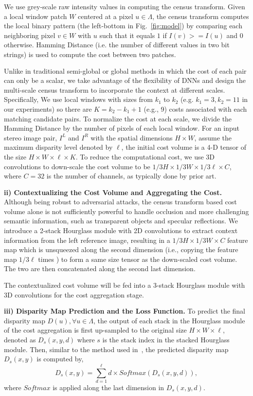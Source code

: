 \documentclass[10pt,twocolumn,letterpaper]{article}
\begin{document}
We use grey-scale raw intensity values in computing the census transform. Given a local window patch $W$ centered at a pixel $u\in\Lambda$, the census transform computes the local binary pattern (the left-bottom in Fig.~\ref{fig:model}) by comparing each neighboring pixel $v\in{W}$ with $u$ such that it equals $1$ if $I(v)>=I(u)$ and $0$ otherwise. Hamming Distance (i.e. the number of different values in two bit strings) is used to compute the cost between two patches.

Unlike in traditional semi-global or global methods in which the cost of each pair can only be a scalar, we take advantage of the flexibility of DNNs and design the multi-scale census transform to incorporate the context at different scales. Specifically, We use local windows with sizes from $k_1$ to $k_2$ (e.g. $k_1=3, k_2=11$ in our experiments) so there are $K=k_2-k_1+1$ (e.g., 9) costs associated with each matching candidate pairs. To normalize the cost at each scale, we divide the Hamming Distance by the number of pixels of each local window. %
For an input stereo image pair, $I^L$ and $I^R$ with the spatial dimensions $H\times{W}$, assume the maximum disparity level denoted by $\ell$, the initial cost volume is a 4-D tensor of the size $H\times{W}\times{\ell}\times{K}$. To reduce the computational cost, we use 3D convolutions to down-scale the cost volume to be $1/3H\times{1/3W}\times{1/3\ell}\times{C}$, where $C=32$ is the number of channels, as typically done by prior art.

\textbf{ii) Contextualizing the Cost Volume and Aggregating the Cost.}
Although being robust to adversarial attacks, the census transform based cost volume alone is not sufficiently powerful to handle occlusion and more challenging semantic information, such as transparent objects and specular reflections. 
We introduce a 2-stack Hourglass module with 2D convolutions to extract context information from the left reference image, resulting in a $1/3H\times{1/3W}\times{C}$ feature map which is unsqueezed along the second dimension (i.e., copying the feature map $1/3\ell$ times ) to form a same size tensor as the down-scaled cost volume. The two are then concatenated along the second last dimension.

The contextualized cost volume will be fed into a 3-stack Hourglass module with 3D convolutions for the cost aggregation stage.

\textbf{iii) Disparity Map Prediction and the Loss Function.}
To predict the final disparity map $D(u),\forall u\in \Lambda$, the output of each stack in the Hourglass module of the cost aggregation is first up-sampled to the original size $H\times{W}\times{\ell}$, denoted as $D_s(x,y,d)$ where $s$ is the stack index in the stacked Hourglass module. Then, similar to the method used in~\cite{gcnet2017}, the predicted disparity map $D_s(x,y)$ is computed by,
\begin{equation}
    D_s(x,y)= \sum_{d=1}^{\ell}{d\times{Softmax(D_s(x,y,d))}}, 
\end{equation}
where $Softmax$ is applied along the last dimension in $D_s(x,y,d)$. 
\end{document}
